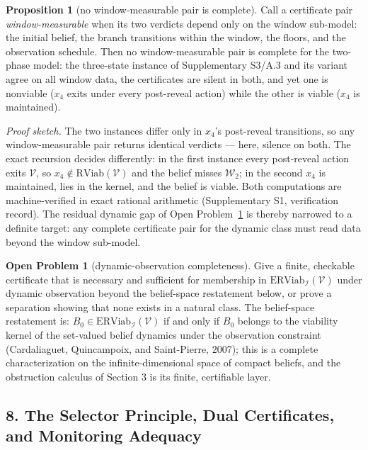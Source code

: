 \documentclass[10pt,twocolumn]{article}
\theoremstyle{definition}
\newtheorem{proposition}{Proposition}
\newtheorem{openproblem}{Open Problem}
\begin{document}
\begin{proposition}[no window-measurable pair is complete]\label{calc-prop:window-nogo}
Call a certificate pair \emph{window-measurable} when its two verdicts depend only on the
window sub-model: the initial belief, the branch transitions within the window, the floors,
and the observation schedule. Then no window-measurable pair is complete for the two-phase
model: the three-state instance of Supplementary S3/A.3 and its variant agree on all window
data, the certificates are silent in both, and yet one is nonviable (\(x_{4}\) exits under
every post-reveal action) while the other is viable (\(x_{4}\) is maintained).
\end{proposition}

\emph{Proof sketch.} The two instances differ only in \(x_{4}\)'s post-reveal transitions,
so any window-measurable pair returns identical verdicts --- here, silence on both. The
exact recursion decides differently: in the first instance every post-reveal action exits
\(\mathcal{V}\), so \(x_{4} \notin \mathrm{RViab}(\mathcal{V})\) and the belief misses
\(\mathcal{W}_{2}\); in the second \(x_{4}\) is maintained, lies in the kernel, and the
belief is viable. Both computations are machine-verified in exact rational arithmetic
(Supplementary S1, verification record). The residual dynamic gap of
Open Problem~\ref{calc-op:dynamic} is thereby narrowed to a definite target: any complete
certificate pair for the dynamic class must read data beyond the window sub-model.

\begin{openproblem}[dynamic-observation completeness]\label{calc-op:dynamic}
Give a finite, checkable certificate that is necessary and sufficient for membership in \(\mathrm{ERViab}_{\mathcal{I}}(\mathcal{V})\) under dynamic observation beyond the belief-space restatement below, or prove a separation showing that none exists in a natural class. The belief-space restatement is: \(B_{0} \in \mathrm{ERViab}_{\mathcal{I}}(\mathcal{V})\) if and only if \(B_{0}\) belongs to the viability kernel of the set-valued belief dynamics under the observation constraint (Cardaliaguet, Quincampoix, and Saint-Pierre, 2007); this is a complete characterization on the infinite-dimensional space of compact beliefs, and the obstruction calculus of Section 3 is its finite, certifiable layer.
\end{openproblem}

\subsection{8. The Selector Principle, Dual Certificates, and Monitoring Adequacy}\label{calc-selector-principle}
\end{document}
